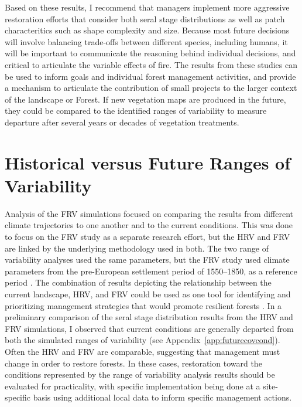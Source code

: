 Based on these results, I recommend that managers implement more aggressive restoration efforts that consider both seral stage distributions as well as patch characteritics such as shape complexity and size. Because most future decisions will involve balancing trade-offs between different species, including humans, it will be important to communicate the reasoning behind individual decisions, and critical to articulate the variable effects of fire. The results from these studies can be used to inform goals and individual forest management activities, and provide a mechanism to articulate the contribution of small projects to the larger context of the landscape or Forest. If new vegetation maps are produced in the future, they could be compared to the identified ranges of variability to measure departure after several years or decades of vegetation treatments.


\section{Historical versus Future Ranges of Variability}
Analysis of the FRV simulations focused on comparing the results from different climate trajectories to one another and to the current conditions. This was done to focus on the FRV study as a separate research effort, but the HRV and FRV are linked by the underlying methodology used in both. The two range of variability analyses used the same parameters, but the FRV study used climate parameters from the pre-European settlement period of 1550--1850, as a reference period \citep{Safford2013}. The combination of results depicting the relationship between the current landscape, HRV, and FRV could be used as one tool for identifying and prioritizing management strategies that would promote resilient forests \citep{Keane2009}. In a preliminary comparison of the seral stage distribution results from the HRV and FRV simulations, I observed that current conditions are generally departed from both the simulated ranges of variability (see Appendix~\ref{app:futurecovcond}). Often the HRV and FRV are comparable, suggesting that management must change in order to restore forests. In these cases, restoration toward the conditions represented by the range of variability analysis results should be evaluated for practicality, with specific implementation being done at a site-specific basis using additional local data to inform specific management actions.


